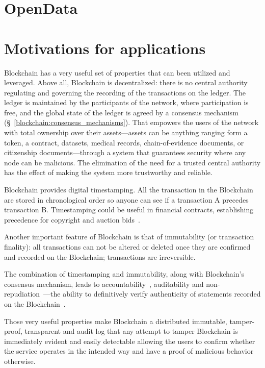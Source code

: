 \section{OpenData}\label{problem:opendata}

\section{Motivations for applications}\label{problem:motivations}

Blockchain has a very useful set of properties that can been utilized and leveraged. Above all, Blockchain is decentralized: there is no central authority regulating and governing the recording of the transactions on the ledger. The ledger is maintained by the participants of the network, where participation is free, and the global state of the ledger is agreed by a consensus mechanism (§~\ref{blockchain:consensus_mechanisms}). That empowers the users of the network with total ownership over their assets---assets can be anything ranging form a token, a contract, datasets, medical records, chain-of-evidence documents, or citizenship documents---through a system that guarantees security where any node can be malicious. The elimination of the need for a trusted central authority has the effect of making the system more trustworthy and reliable.

Blockchain provides digital timestamping. All the transaction in the Blockchain are stored in chronological order so anyone can see if a transaction A precedes transaction B. Timestamping could be useful in financial contracts, establishing precedence for copyright and auction bids~\cite{bl_auditability}.

Another important feature of Blockchain is that of immutability (or transaction finality): all transactions can not be altered or deleted once they are confirmed and recorded on the Blockchain; transactions are irreversible.

The combination of timestamping and immutability, along with Blockchain's consensus mechanism, leads to  accountability~\cite{10.1007/978-3-540-46588-1_20}, auditability and non-repudiation~\cite{wiki:non_repudiation}---the ability
to definitively verify authenticity of statements recorded on the Blockchain~\cite{bl_auditability}.

Those very useful properties make Blockchain a distributed immutable, tamper-proof, transparent and audit log that any attempt to tamper Blockchain is immediately evident and easily detectable allowing the users to confirm whether the service operates in the intended way and have a proof of malicious behavior otherwise.

